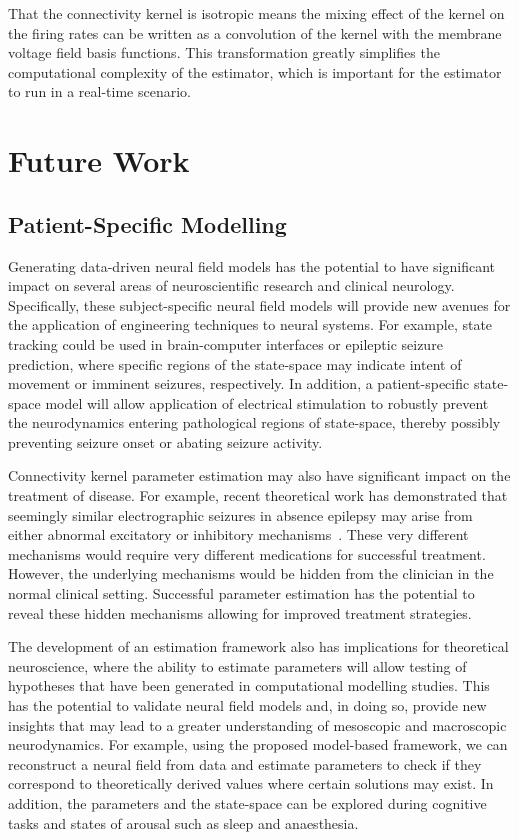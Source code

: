 \documentclass[12pt]{iopart}
\begin{document}
That the connectivity kernel is isotropic means the mixing effect of the kernel on the firing rates can be written as a convolution of the kernel with the membrane voltage field basis functions. This transformation greatly simplifies the computational complexity of the estimator, which is important for the estimator to run in a real-time scenario.


\section{Future Work}

\subsection{Patient-Specific Modelling}

Generating data-driven neural field models has the potential to have significant impact on several areas of neuroscientific research and clinical neurology. Specifically, these subject-specific neural field models will provide new avenues for the application of engineering techniques to neural systems. For example, state tracking could be used in brain-computer interfaces or epileptic seizure prediction, where specific regions of the state-space may indicate intent of movement or imminent seizures, respectively. In addition, a patient-specific state-space model will allow application of electrical stimulation to robustly prevent the neurodynamics entering pathological regions of state-space, thereby possibly preventing seizure onset or abating seizure activity.

Connectivity kernel parameter estimation may also have significant impact on the treatment of disease. For example, recent theoretical work has demonstrated that seemingly similar electrographic seizures in absence epilepsy may arise from either abnormal excitatory or inhibitory mechanisms~\cite{Marten2009}. These very different mechanisms would require very different medications for successful treatment. However, the underlying mechanisms would be hidden from the clinician in the normal clinical setting. Successful parameter estimation has the potential to reveal these hidden mechanisms allowing for improved treatment strategies. 

The development of an estimation framework also has implications for theoretical neuroscience, where the ability to estimate parameters will allow testing of hypotheses that have been generated in computational modelling studies. This has the potential to validate neural field models and, in doing so, provide new insights that may lead to a greater understanding of mesoscopic and macroscopic neurodynamics. For example, using the proposed model-based framework, we can reconstruct a neural field from data and estimate parameters to check if they correspond to theoretically derived values where certain solutions may exist. In addition, the parameters and the state-space can be explored during cognitive tasks and states of arousal such as sleep and anaesthesia. 
\end{document}
